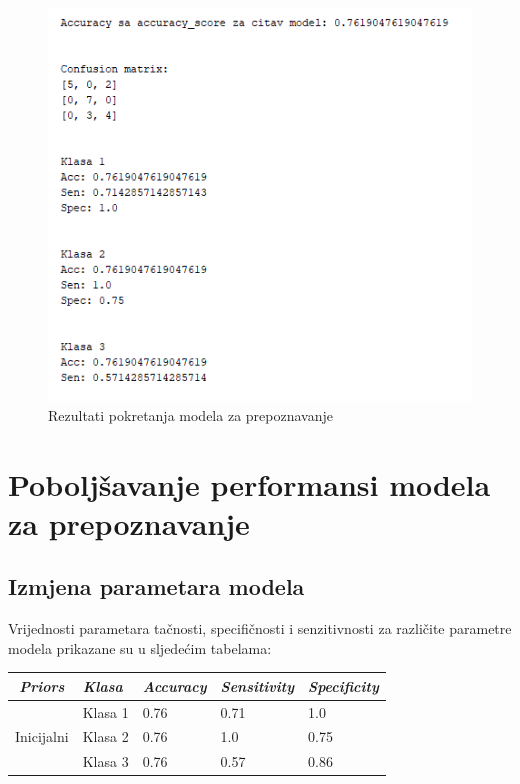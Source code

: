 \documentclass[12pt,a4paper]{article}
\begin{document}
\begin{figure}[H]

\center
\includegraphics[scale=0.9]{slikaTest.png}
\caption{Rezultati pokretanja modela za prepoznavanje}
	
\end{figure}

\newpage

\section{Poboljšavanje performansi modela za prepoznavanje}

\subsection{Izmjena parametara modela}

Vrijednosti parametara tačnosti, specifičnosti i senzitivnosti za različite parametre modela prikazane su u sljedećim tabelama:

\begin{table}[H]
\centering
\begin{tabular}{|c|l|l|l|l|}
\hline
\textbf{\textit{Priors}}				& \textbf{\textit{Klasa}}   	& \textbf{\textit{Accuracy}} 	& \textbf{\textit{Sensitivity}} 	& \textbf{\textit{Specificity}} 		\\ \hline
\multirow{3}{*}{Inicijalni}    	 		& Klasa 1 				& 0.76              					& 0.71                 					& 1.0                		\\ \cline{2-5} 
                                				& Klasa 2 				& 0.76              					& 1.0                  					& 0.75           		\\ \cline{2-5} 
                                				& Klasa 3 				& 0.76              					& 0.57                 					& 0.86      			\\ \hline
\end{tabular}
\end{table}
\end{document}
